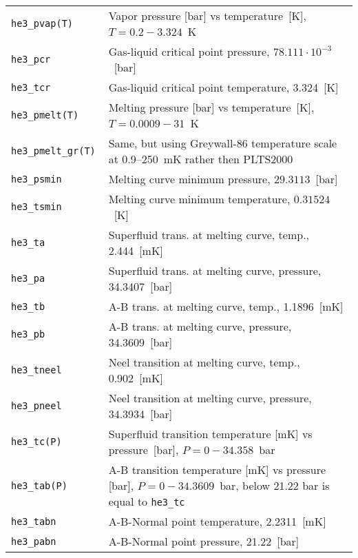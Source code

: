 \documentclass[a4paper]{article}
\begin{document}
\medskip
\begin{tabular}{lp{9cm}}
\tt he3\_pvap(T)  & Vapor pressure [bar] vs temperature~[K],\newline
                    $ T = 0.2 - 3.324$~K \\
\tt he3\_pcr      & Gas-liquid critical point pressure, $78.111\cdot 10^{-3}$~[bar] \\
\tt he3\_tcr      & Gas-liquid critical point temperature, 3.324~[K] \\
\tt he3\_pmelt(T) & Melting pressure [bar] vs temperature~[K],\newline
                    $ T = 0.0009 - 31$~K\\
\tt he3\_pmelt\_gr(T) & Same, but using Greywall-86 temperature scale at
                    0.9--250~mK rather then PLTS2000\\
\tt he3\_psmin    & Melting curve minimum pressure, $29.3113$~[bar]\\
\tt he3\_tsmin    & Melting curve minimum temperature, $0.31524$~[K]\\
\tt he3\_ta       & Superfluid trans. at melting curve, temp., 2.444~[mK]\\
\tt he3\_pa       & Superfluid trans. at melting curve, pressure, 34.3407~[bar]\\
\tt he3\_tb       & A-B trans. at melting curve, temp., 1.1896~[mK]\\
\tt he3\_pb       & A-B trans. at melting curve, pressure, 34.3609~[bar]\\
\tt he3\_tneel    & Neel transition at melting curve, temp., 0.902~[mK]\\
\tt he3\_pneel    & Neel transition at melting curve, pressure, 34.3934~[bar]\\
\tt he3\_tc(P)    & Superfluid transition temperature [mK] vs pressure~[bar],\newline
                    $ P = 0 - 34.358 $~bar\\
\tt he3\_tab(P)   & A-B transition temperature [mK] vs pressure [bar],\newline
                    $ P = 0 - 34.3609 $~bar, below 21.22 bar is equal to {\tt he3\_tc}\\
\tt he3\_tabn     & A-B-Normal point temperature, 2.2311~[mK]\\
\tt he3\_pabn     & A-B-Normal point pressure, 21.22~[bar]\\
\end{tabular}
\medskip

\eject
\end{document}
